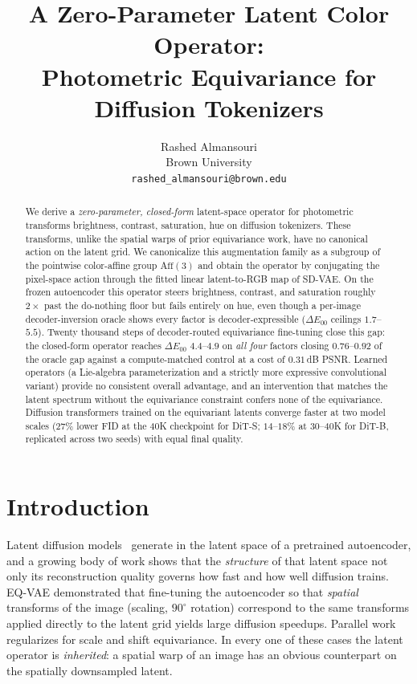 \documentclass[11pt]{article}
\title{A Zero-Parameter Latent Color Operator:\\
Photometric Equivariance for Diffusion Tokenizers}
\author{Rashed Almansouri\\
\small Brown University\\
\small \texttt{rashed\_almansouri@brown.edu}}
\date{}
\newcommand{\de}{\Delta E_{00}}
\begin{document}
\maketitle

\begin{abstract}
We derive a \emph{zero-parameter, closed-form} latent-space operator for
photometric transforms brightness, contrast, saturation, hue on diffusion
tokenizers. These transforms, unlike the spatial warps of prior equivariance
work, have no canonical action on the latent grid. We canonicalize this
augmentation family as a subgroup of the pointwise color-affine group
$\mathrm{Aff}(3)$ and obtain the operator by conjugating the pixel-space
action through the fitted linear latent-to-RGB map of SD-VAE. On the frozen autoencoder this
operator steers brightness, contrast, and saturation roughly $2\times$ past the
do-nothing floor but fails entirely on hue, even though a per-image
decoder-inversion oracle shows every factor is decoder-expressible
($\de$ ceilings $1.7$--$5.5$). Twenty thousand steps of decoder-routed
equivariance fine-tuning close this gap: the closed-form operator reaches
$\de$ $4.4$--$4.9$ on \emph{all four} factors closing $0.76$--$0.92$ of
the oracle gap against a compute-matched control at a cost of
$0.31$\,dB PSNR. Learned operators
(a Lie-algebra parameterization and a strictly more expressive convolutional
variant) provide no consistent overall advantage, and an intervention that matches the
latent spectrum without the equivariance constraint confers none of the
equivariance. Diffusion transformers trained on the equivariant latents
converge faster at two model scales ($27\%$ lower FID at the 40K checkpoint
for DiT-S; $14$--$18\%$ at 30--40K for DiT-B, replicated across two seeds)
with equal final quality.
\end{abstract}

\section{Introduction}

Latent diffusion models~\citep{rombach2022ldm,peebles2023dit} generate in the
latent space of a pretrained autoencoder, and a growing body of work shows that
the \emph{structure} of that latent space not only its reconstruction
quality governs how fast and how well diffusion trains. EQ-VAE
\citep{kouzelis2025eqvae} demonstrated that fine-tuning the autoencoder so that
\emph{spatial} transforms of the image (scaling, $90^\circ$ rotation)
correspond to the same transforms applied directly to the latent grid yields
large diffusion speedups. Parallel work regularizes for scale
\citep{skorokhodov2025diffusability} and shift \citep{zhou2025afldm}
equivariance. In every one of these cases the latent operator is
\emph{inherited}: a spatial warp of an image has an obvious counterpart on the
spatially downsampled latent.
\end{document}
